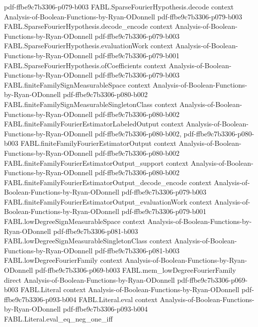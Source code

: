 \begin{theorem}
  {pdf-ffbe9c7b3306-p079-b003}
\proofstep
  {FABL.SparseFourierHypothesis.decode}
  {context}
  {Analysis-of-Boolean-Functions-by-Ryan-ODonnell}
  {pdf-ffbe9c7b3306-p079-b003}
\proofstep
  {FABL.SparseFourierHypothesis.decode_encode}
  {context}
  {Analysis-of-Boolean-Functions-by-Ryan-ODonnell}
  {pdf-ffbe9c7b3306-p079-b003}
\proofstep
  {FABL.SparseFourierHypothesis.evaluationWork}
  {context}
  {Analysis-of-Boolean-Functions-by-Ryan-ODonnell}
  {pdf-ffbe9c7b3306-p079-b001}
\proofstep
  {FABL.SparseFourierHypothesis.ofCoefficients}
  {context}
  {Analysis-of-Boolean-Functions-by-Ryan-ODonnell}
  {pdf-ffbe9c7b3306-p079-b003}
\proofstep
  {FABL.finiteFamilySignMeasurableSpace}
  {context}
  {Analysis-of-Boolean-Functions-by-Ryan-ODonnell}
  {pdf-ffbe9c7b3306-p080-b002}
\proofstep
  {FABL.finiteFamilySignMeasurableSingletonClass}
  {context}
  {Analysis-of-Boolean-Functions-by-Ryan-ODonnell}
  {pdf-ffbe9c7b3306-p080-b002}
\proofstep
  {FABL.finiteFamilyFourierEstimatorLabeledOutput}
  {context}
  {Analysis-of-Boolean-Functions-by-Ryan-ODonnell}
  {pdf-ffbe9c7b3306-p080-b002,
    pdf-ffbe9c7b3306-p080-b003}
\proofstep
  {FABL.finiteFamilyFourierEstimatorOutput}
  {context}
  {Analysis-of-Boolean-Functions-by-Ryan-ODonnell}
  {pdf-ffbe9c7b3306-p080-b002}
\proofstep
  {FABL.finiteFamilyFourierEstimatorOutput_support}
  {context}
  {Analysis-of-Boolean-Functions-by-Ryan-ODonnell}
  {pdf-ffbe9c7b3306-p080-b002}
\proofstep
  {FABL.finiteFamilyFourierEstimatorOutput_decode_encode}
  {context}
  {Analysis-of-Boolean-Functions-by-Ryan-ODonnell}
  {pdf-ffbe9c7b3306-p079-b003}
\proofstep
  {FABL.finiteFamilyFourierEstimatorOutput_evaluationWork}
  {context}
  {Analysis-of-Boolean-Functions-by-Ryan-ODonnell}
  {pdf-ffbe9c7b3306-p079-b001}
\proofstep
  {FABL.lowDegreeSignMeasurableSpace}
  {context}
  {Analysis-of-Boolean-Functions-by-Ryan-ODonnell}
  {pdf-ffbe9c7b3306-p081-b003}
\proofstep
  {FABL.lowDegreeSignMeasurableSingletonClass}
  {context}
  {Analysis-of-Boolean-Functions-by-Ryan-ODonnell}
  {pdf-ffbe9c7b3306-p081-b003}
\proofstep
  {FABL.lowDegreeFourierFamily}
  {context}
  {Analysis-of-Boolean-Functions-by-Ryan-ODonnell}
  {pdf-ffbe9c7b3306-p069-b003}
\proofstep
  {FABL.mem_lowDegreeFourierFamily}
  {direct}
  {Analysis-of-Boolean-Functions-by-Ryan-ODonnell}
  {pdf-ffbe9c7b3306-p069-b003}
\proofstep
  {FABL.Literal}
  {context}
  {Analysis-of-Boolean-Functions-by-Ryan-ODonnell}
  {pdf-ffbe9c7b3306-p093-b004}
\proofstep
  {FABL.Literal.eval}
  {context}
  {Analysis-of-Boolean-Functions-by-Ryan-ODonnell}
  {pdf-ffbe9c7b3306-p093-b004}
\proofstep
  {FABL.Literal.eval_eq_neg_one_iff}

\end{theorem}
